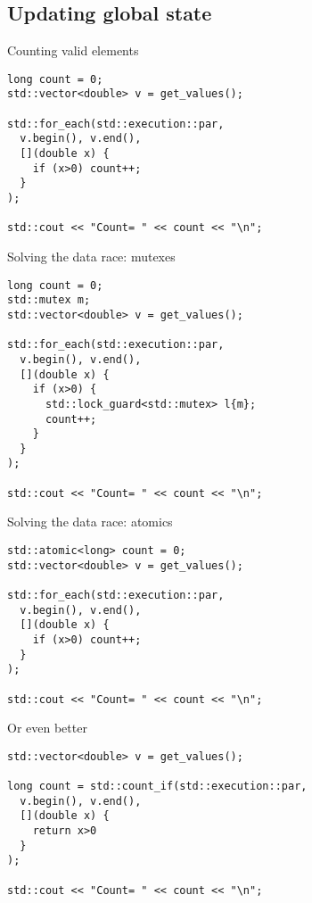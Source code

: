 \subsection{Updating global state}

\begin{frame}[t,fragile]{Counting valid elements}
\begin{lstlisting}
long count = 0;
std::vector<double> v = get_values();

std::for_each(std::execution::par,
  v.begin(), v.end(),
  [](double x) {
    if (x>0) count++;
  }
);

std::cout << "Count= " << count << "\n";
\end{lstlisting}
\end{frame}

\begin{frame}[t,fragile]{Solving the data race: mutexes}
\begin{lstlisting}
long count = 0;
std::mutex m;
std::vector<double> v = get_values();

std::for_each(std::execution::par,
  v.begin(), v.end(),
  [](double x) {
    if (x>0) {
      std::lock_guard<std::mutex> l{m};
      count++;
    }
  }
);

std::cout << "Count= " << count << "\n";
\end{lstlisting}
\end{frame}

\begin{frame}[t,fragile]{Solving the data race: atomics}
\begin{lstlisting}
std::atomic<long> count = 0;
std::vector<double> v = get_values();

std::for_each(std::execution::par,
  v.begin(), v.end(),
  [](double x) {
    if (x>0) count++;
  }
);

std::cout << "Count= " << count << "\n";
\end{lstlisting}
\end{frame}

\begin{frame}[t,fragile]{Or even better}
\begin{lstlisting}
std::vector<double> v = get_values();

long count = std::count_if(std::execution::par,
  v.begin(), v.end(),
  [](double x) {
    return x>0
  }
);

std::cout << "Count= " << count << "\n";
\end{lstlisting}
\end{frame}

